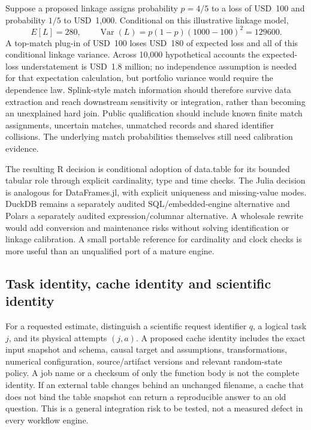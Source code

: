 Suppose a proposed linkage assigns probability $p=4/5$ to a loss of USD~100 and probability $1/5$ to USD~1,000. Conditional on this illustrative linkage model,
\[
 E[L]=280,\qquad
 \operatorname{Var}(L)=p(1-p)(1000-100)^2=129600.
\]
A top-match plug-in of USD~100 loses USD~180 of expected loss and all of this conditional linkage variance. Across 10,000 hypothetical accounts the expected-loss understatement is USD~1.8 million; no independence assumption is needed for that expectation calculation, but portfolio variance would require the dependence law. Splink-style match information should therefore survive data extraction and reach downstream sensitivity or integration, rather than becoming an unexplained hard join. Public qualification should include known finite match assignments, uncertain matches, unmatched records and shared identifier collisions. The underlying match probabilities themselves still need calibration evidence.~\citep{exec24_splink_sources,exec24_splink_contract,exec25_dww_choice}

The resulting R decision is conditional adoption of data.table for its bounded tabular role through explicit cardinality, type and time checks. The Julia decision is analogous for DataFrames.jl, with explicit uniqueness and missing-value modes. DuckDB remains a separately audited SQL/embedded-engine alternative and Polars a separately audited expression/columnar alternative. A wholesale rewrite would add conversion and maintenance risks without solving identification or linkage calibration. A small portable reference for cardinality and clock checks is more useful than an unqualified port of a mature engine.~\citep{exec19_duckdb_source,exec19_duckdb_reference,exec23_polars_sources,exec23_polars_reference,exec25_otm_polars,exec25_dww_choice}

\subsection{Task identity, cache identity and scientific identity}

For a requested estimate, distinguish a scientific request identifier $q$, a logical task $j$, and its physical attempts $(j,a)$. A proposed cache identity includes the exact input snapshot and schema, causal target and assumptions, transformations, numerical configuration, source/artifact versions and relevant random-state policy. A job name or a checksum of only the function body is not the complete identity. If an external table changes behind an unchanged filename, a cache that does not bind the table snapshot can return a reproducible answer to an old question. This is a general integration risk to be tested, not a measured defect in every workflow engine.~\citep{exec25_dww_choice,exec24_openlineage_source,exec24_openlineage_reference}

